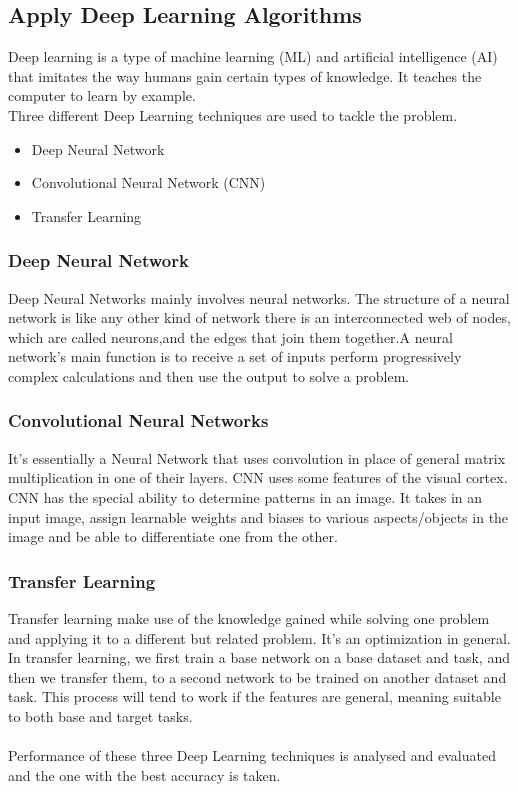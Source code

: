 \subsection{Apply Deep Learning Algorithms}
Deep learning is a type of machine learning (ML) and artificial intelligence (AI) that imitates the way humans gain certain types of knowledge. It teaches the computer to learn by example.\\
Three different Deep Learning techniques are used to tackle the problem.
\begin{itemize}
    \item Deep Neural Network
    \item Convolutional Neural Network (CNN)
    \item Transfer Learning
\end{itemize}
\subsubsection{Deep Neural Network}
Deep Neural Networks mainly involves neural networks.
The structure of a neural network is like any other kind of network there is an interconnected web of nodes, which are called neurons,and the edges that join them together.A neural network's main function is to receive a set of inputs perform progressively complex calculations and then use the output to solve a problem.
\subsubsection{Convolutional Neural Networks}
It's essentially a Neural Network that uses convolution in place of general matrix multiplication in one of their layers.
CNN uses some features of the visual cortex.
CNN has the special ability to determine patterns in an image.
It takes in an input image, assign learnable weights and biases to various aspects/objects in the image and be able to differentiate one from the other.
\subsubsection{Transfer Learning}
Transfer learning make use of the knowledge gained while solving one problem and applying it to a different but related problem. It's an optimization in general.\\
In transfer learning, we first train a base network on a base dataset and task, and then we transfer them, to a second network to be trained on another dataset and task. This process will tend to work if the features are general, meaning suitable to both base and target tasks.\\ \\
Performance of these three Deep Learning techniques is analysed and evaluated and the one with the best accuracy is taken.
